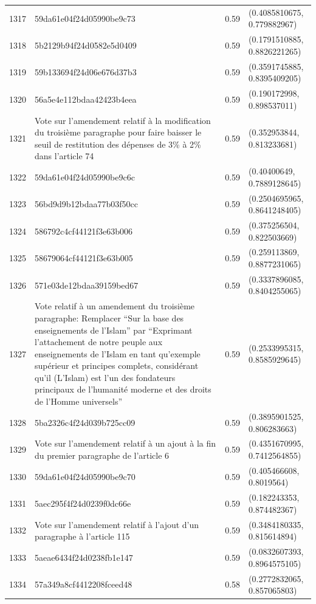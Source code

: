 \begin{table}[ht]
\begin{tabular}{rlrl}
  1317 & 59da61e04f24d05990be9c73 & 0.59 & (0.4085810675, 0.779882967) \\ 
  1318 & 5b2129b94f24d0582e5d0409 & 0.59 & (0.1791510885, 0.8826221265) \\ 
  1319 & 59b133694f24d06e676d37b3 & 0.59 & (0.3591745885, 0.8395409205) \\ 
  1320 & 56a5e4e112bdaa42423b4eea & 0.59 & (0.190172998, 0.898537011) \\ 
  1321 & Vote sur l'amendement relatif à la modification du troisième paragraphe pour faire baisser le seuil de restitution des dépenses de 3\% à 2\% dans l'article 74 & 0.59 & (0.352953844, 0.813233681) \\ 
  1322 & 59da61e04f24d05990be9c6c & 0.59 & (0.40400649, 0.7889128645) \\ 
  1323 & 56bd9d9b12bdaa77b03f50cc & 0.59 & (0.2504695965, 0.8641248405) \\ 
  1324 & 586792c4cf44121f3e63b006 & 0.59 & (0.375256504, 0.822503669) \\ 
  1325 & 58679064cf44121f3e63b005 & 0.59 & (0.259113869, 0.8877231065) \\ 
  1326 & 571e03de12bdaa39159bed67 & 0.59 & (0.3337896085, 0.8404255065) \\ 
  1327 & Vote relatif à un amendement du troisième paragraphe: Remplacer “Sur la base des enseignements de l’Islam” par “Exprimant l’attachement de notre peuple aux enseignements de l’Islam en tant qu’exemple supérieur et principes complets, considérant qu’il (L’Islam) est l’un des fondateurs principaux de l’humanité moderne et des droits de l’Homme universels” & 0.59 & (0.2533995315, 0.8585929645) \\ 
  1328 & 5ba2326c4f24d039b725cc09 & 0.59 & (0.3895901525, 0.806283663) \\ 
  1329 & Vote sur l'amendement relatif à un ajout à la fin du premier paragraphe de l'article 6 & 0.59 & (0.4351670995, 0.7412564855) \\ 
  1330 & 59da61e04f24d05990be9c70 & 0.59 & (0.405466608, 0.8019564) \\ 
  1331 & 5aec295f4f24d0239f0dc66e & 0.59 & (0.182243353, 0.874482367) \\ 
  1332 & Vote sur l'amendement relatif à l'ajout d'un paragraphe à l'article 115 & 0.59 & (0.3484180335, 0.815614894) \\ 
  1333 & 5aeae6434f24d0238fb1e147 & 0.59 & (0.0832607393, 0.8964575105) \\ 
  1334 & 57a349a8cf4412208fceed48 & 0.58 & (0.2772832065, 0.857065803) \\ 

\end{tabular}
\end{table}
